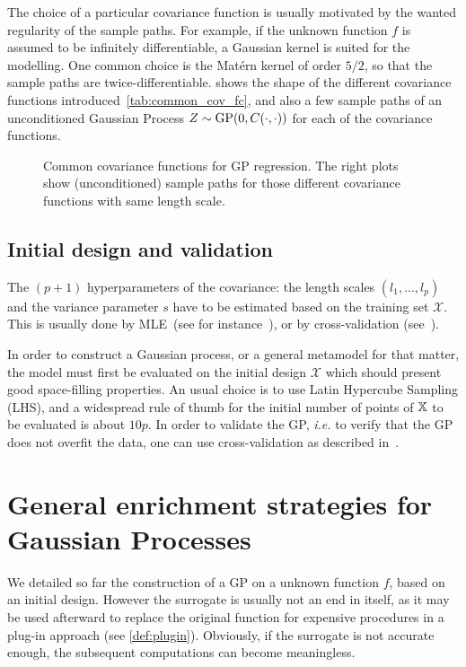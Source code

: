 \documentclass[../../Main_ManuscritThese.tex]{subfiles}
\newcommand\imgpath{/home/victor/acadwriting/Manuscrit/Text/Chapter4/img/}
\begin{document}
  The choice of a particular covariance function is usually motivated
  by the wanted regularity of the sample paths. For example, if the
  unknown function $f$ is assumed to be infinitely differentiable, a
  Gaussian kernel is suited for the modelling. One common choice is
  the Matérn kernel of order $5/2$, so that the sample paths are
  twice-differentiable.  shows the shape of
  the different covariance functions
  introduced~\cref{tab:common_cov_fc}, and also a few sample paths of
  an unconditioned Gaussian Process $Z\sim\operatorname{\mathrm{GP}}(0, C(\cdot, \cdot))$ for
  each of the covariance functions.
  
\begin{figure}[ht]
  \centering
  
  \caption[Common covariance functions for GP]{\label{fig:cov_fc_examples} Common covariance functions for GP regression. The right plots show (unconditioned) sample paths for those different covariance functions with same length scale.}
\end{figure}

\subsection{Initial design and validation}

The $(p + 1)$ hyperparameters of the covariance: the length scales
$(l_1,\dots,l_{p})$ and the variance parameter $s$ have to be
estimated based on the training set $\mathcal{X}$. This is usually
done by MLE~(see for instance~\cite{ribaud_robustness_2019}), or by
cross-validation (see~\cite{ginsbourger_note_2009}).

In order to construct a Gaussian process, or a general metamodel for
that matter, the model must first be evaluated on the initial design
$\mathcal{X}$ which should present good space-filling properties. An
usual choice is to use Latin Hypercube Sampling (LHS), and a
widespread rule of thumb for the initial number of points of $\mathbb{X}$
to be evaluated is about $10p$. In order to validate the GP,
\emph{i.e.} to verify that the GP does not overfit the data, one can
use cross-validation as described in~\cite{dubrule_cross_1983}.


\section{General enrichment strategies for Gaussian Processes}
\label{sec:enrichment_strategies}

We detailed so far the construction of a GP on a unknown function $f$,
based on an initial design. However the surrogate is usually not an
end in itself, as it may be used afterward to replace the original
function for expensive procedures in a plug-in approach (see
\cref{def:plugin}). Obviously, if the surrogate is not accurate
enough, the subsequent computations can become meaningless.
\end{document}
